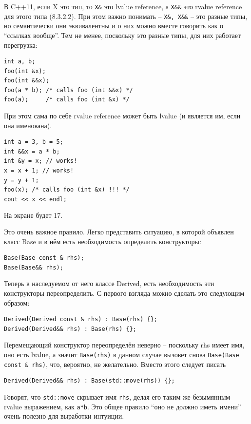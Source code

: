 \documentclass[a4paper,12pt,oneside]{article}
\begin{document}
В C++11, если X это тип, то \lstinline!X&! это lvalue reference, а \lstinline!X&&! это rvalue reference для этого типа (8.3.2.2). При этом важно понимать -- \lstinline!X&, X&&! -- это разные типы, но семантически они эквивалентны и о них можно вместе говорить как о ``ссылках вообще''. Тем не менее, поскольку это разные типы, для них работает перегрузка:

\begin{lstlisting}
int a, b;
foo(int &x);
foo(int &&x);
foo(a * b); /* calls foo (int &&x) */
foo(a);     /* calls foo (int &x) */
\end{lstlisting}

При этом сама по себе rvalue reference может быть lvalue (и является им, если она именована).

\begin{lstlisting}
int a = 3, b = 5;
int &&x = a * b;
int &y = x; // works!
x = x + 1; // works!
y = y + 1; 
foo(x); /* calls foo (int &x) !!! */
cout << x << endl;
\end{lstlisting}

На экране будет 17.

Это очень важное правило. Легко представить ситуацию, в которой объявлен класс Base и в нём есть необходимость определить конструкторы:

\begin{lstlisting}
Base(Base const & rhs);
Base(Base&& rhs);
\end{lstlisting}

Теперь в наследуемом от него классе Derived, есть необходимость эти конструкторы переопределить. С первого взгляда можно сделать это следующим образом:

\begin{lstlisting}
Derived(Derived const & rhs) : Base(rhs) {};
Derived(Derived&& rhs) : Base(rhs) {};
\end{lstlisting}

Перемещающий конструктор переопределён неверно -- поскольку rhs имеет имя, оно есть lvalue, а значит \lstinline!Base(rhs)! в данном случае вызовет снова \lstinline!Base(Base const & rhs)!, что, вероятно, не желательно. Вместо этого следует писать

\begin{lstlisting}
Derived(Derived&& rhs) : Base(std::move(rhs)) {};
\end{lstlisting}

Говорят, что \lstinline!std::move! скрывает имя \lstinline!rhs!, делая его таким же безымянным rvalue выражением, как \lstinline!a*b!. Это общее правило ``оно не должно иметь имени'' очень полезно для выработки интуиции.
\end{document}

